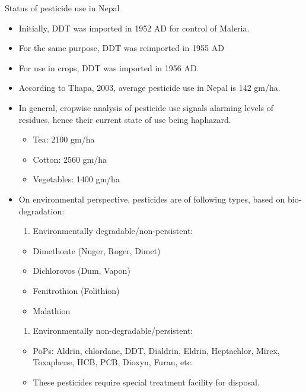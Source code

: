 \documentclass[
]{book}
\providecommand{\tightlist}{%
  \setlength{\itemsep}{0pt}\setlength{\parskip}{0pt}}
\begin{document}
Status of pesticide use in Nepal

\begin{itemize}
\tightlist
\item
  Initially, DDT was imported in 1952 AD for control of Maleria.
\item
  For the same purpose, DDT was reimported in 1955 AD
\item
  For use in crops, DDT was imported in 1956 AD.
\item
  According to Thapa, 2003, average pesticide use in Nepal is 142 gm/ha.
\item
  In general, cropwise analysis of pesticide use signals alarming levels of residues, hence their current state of use being haphazard.

  \begin{itemize}
  \tightlist
  \item
    Tea: 2100 gm/ha
  \item
    Cotton: 2560 gm/ha
  \item
    Vegetables: 1400 gm/ha
  \end{itemize}
\item
  On environmental perspective, pesticides are of following types, based on bio-degradation:

  \begin{enumerate}
  \def\labelenumi{\arabic{enumi}.}
  \tightlist
  \item
    Environmentally degradable/non-persistent:
  \end{enumerate}

  \begin{itemize}
  \tightlist
  \item
    Dimethoate (Nuger, Roger, Dimet)
  \item
    Dichlorovos (Dum, Vapon)
  \item
    Fenitrothion (Folithion)
  \item
    Malathion
  \end{itemize}

  \begin{enumerate}
  \def\labelenumi{\arabic{enumi}.}
  \setcounter{enumi}{1}
  \tightlist
  \item
    Environmentally non-degradable/persistent:
  \end{enumerate}

  \begin{itemize}
  \tightlist
  \item
    PoPs: Aldrin, chlordane, DDT, Dialdrin, Eldrin, Heptachlor, Mirex, Toxaphene, HCB, PCB, Dioxyn, Furan, etc.
  \item
    These pesticides require special treatment facility for disposal.
  \end{itemize}
\end{itemize}
\end{document}
